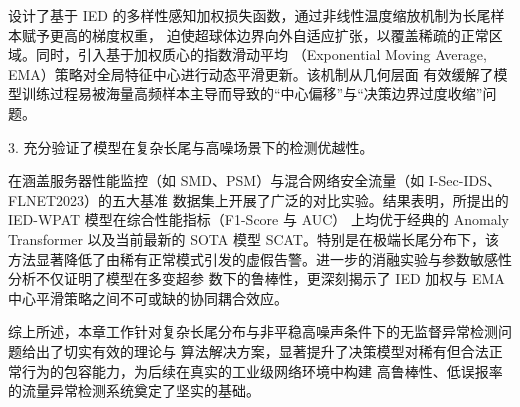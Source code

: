 设计了基于 IED 的多样性感知加权损失函数，通过非线性温度缩放机制为长尾样本赋予更高的梯度权重，
迫使超球体边界向外自适应扩张，以覆盖稀疏的正常区域。同时，引入基于加权质心的指数滑动平均
（Exponential Moving Average, EMA）策略对全局特征中心进行动态平滑更新。该机制从几何层面
有效缓解了模型训练过程易被海量高频样本主导而导致的“中心偏移”与“决策边界过度收缩”问题。

3. 充分验证了模型在复杂长尾与高噪场景下的检测优越性。

在涵盖服务器性能监控（如 SMD、PSM）与混合网络安全流量（如 I-Sec-IDS、FLNET2023）的五大基准
数据集上开展了广泛的对比实验。结果表明，所提出的 IED-WPAT 模型在综合性能指标（F1-Score 与 AUC）
上均优于经典的 Anomaly Transformer 以及当前最新的 SOTA 模型 SCAT。特别是在极端长尾分布下，该
方法显著降低了由稀有正常模式引发的虚假告警。进一步的消融实验与参数敏感性分析不仅证明了模型在多变超参
数下的鲁棒性，更深刻揭示了 IED 加权与 EMA 中心平滑策略之间不可或缺的协同耦合效应。

综上所述，本章工作针对复杂长尾分布与非平稳高噪声条件下的无监督异常检测问题给出了切实有效的理论与
算法解决方案，显著提升了决策模型对稀有但合法正常行为的包容能力，为后续在真实的工业级网络环境中构建
高鲁棒性、低误报率的流量异常检测系统奠定了坚实的基础。
